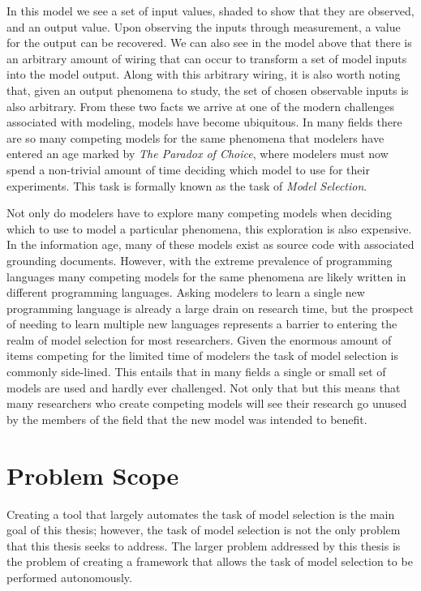 In this model we see a set of input values, shaded to show that they are observed, and an output value. Upon observing the inputs through measurement, a value for the output can be recovered. We can also see in the model above that there is an arbitrary amount of wiring that can occur to transform a set of model inputs into the model output. Along with this arbitrary wiring, it is also worth noting that, given an output phenomena to study, the set of chosen observable inputs is also arbitrary. From these two facts we arrive at one of the modern challenges associated with modeling, models have become ubiquitous. In many fields there are so many competing models for the same phenomena that modelers have entered an age marked by \textit{The Paradox of Choice}, where modelers must now spend a non-trivial amount of time deciding which model to use for their experiments. This task is formally known as the task of \textit{Model Selection}.

 Not only do modelers have to explore many competing models when deciding which to use to model a particular phenomena, this exploration is also expensive. In the information age, many of these models exist as source code with associated grounding documents. However, with the extreme prevalence of programming languages many competing models for the same phenomena are likely written in different programming languages. Asking modelers to learn a single new programming language is already a large drain on research time, but the prospect of needing to learn multiple new languages represents a barrier to entering the realm of model selection for most researchers. Given the enormous amount of items competing for the limited time of modelers the task of model selection is commonly side-lined. This entails that in many fields a single or small set of models are used and hardly ever challenged. Not only that but this means that many researchers who create competing models will see their research go unused by the members of the field that the new model was intended to benefit.

\section{Problem Scope\label{sec:prob_scope}}
Creating a tool that largely automates the task of model selection is the main goal of this thesis; however, the task of model selection is not the only problem that this thesis seeks to address. The larger problem addressed by this thesis is the problem of creating a framework that allows the task of model selection to be performed autonomously.

